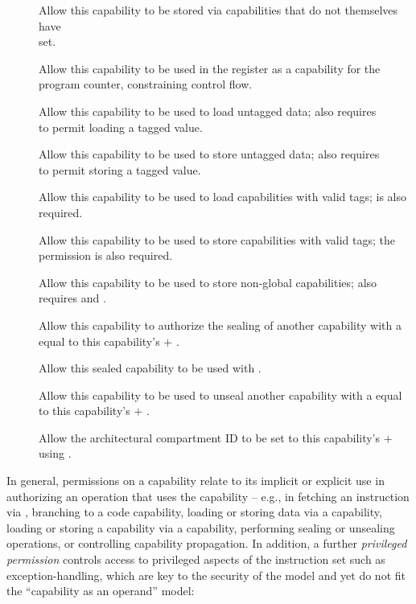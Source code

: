 \begin{description}
\item[\cappermG] Allow this capability to be stored via capabilities that do not themselves have \\ \cappermSLC set.

\item[\cappermX] Allow this capability to be used in the \PCC{} register as a capability for the program counter, constraining control flow.

\item[\cappermL] Allow this capability to be used to load untagged data; also requires \\ \cappermLC to permit loading a tagged value.

\item[\cappermS] Allow this capability to be used to store untagged data; also requires \\ \cappermSC to permit storing a tagged value.

\item[\cappermLC] Allow this capability to be used to load capabilities with valid tags; \cappermL is also required.

\item[\cappermSC] Allow this capability to be used to store capabilities with valid tags; the permission \cappermS is also required.

\item[\cappermSLC] Allow this capability to be used to store non-global capabilities; also requires \cappermS and \cappermSC.

\item[\cappermSeal] Allow this capability to authorize the sealing of another capability with a \cotype{} equal to this capability's \cbase{} $+$ \coffset{}.

\item[\cappermCInvoke] Allow this sealed capability to be used with .

\item[\cappermUnseal] Allow this capability to be used to unseal another capability with a \cotype{} equal to this capability's \cbase{} $+$ \coffset{}.

\item[\cappermCid] Allow the architectural compartment ID to be set to this capability's \cbase{} $+$ \coffset{} using .
\end{description}

In general, permissions on a capability relate to its implicit or explicit
use in authorizing an operation that uses the capability -- e.g., in fetching
an instruction via \PCC{}, branching to a code capability, loading or storing
data via a capability, loading or storing a capability via a capability,
performing sealing or unsealing operations, or controlling capability
propagation.
In addition, a further \textit{privileged permission} controls access to
privileged aspects of the instruction set such as exception-handling, which
are key to the security of the model and yet do not fit the ``capability as an
operand'' model:

